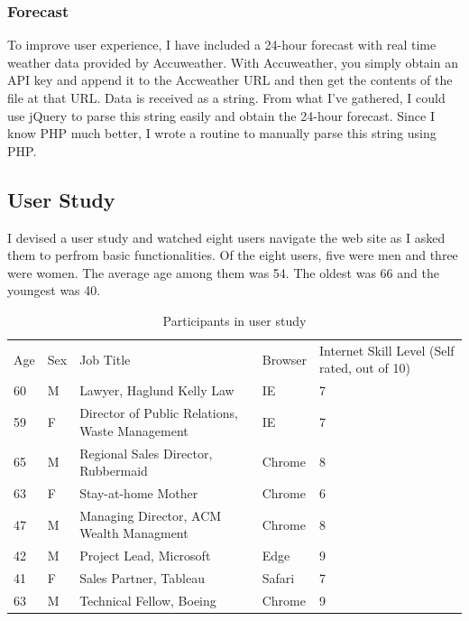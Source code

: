\documentclass[IEEEtran,letterpaper,10pt,titlepage,fleqn,draftclsnofoot,onecolumn]{article}
\begin{document}
\subsubsection{Forecast}

To improve user experience, I have included a 24-hour forecast with real time weather data provided by Accuweather. With Accuweather, you simply obtain an API key and append it to the Accweather URL and then get the contents of the file at that URL. Data is received as a string. From what I've gathered, I could use jQuery to parse this string easily and obtain the 24-hour forecast. Since I know PHP much better, I wrote a routine to manually parse this string using PHP.

\subsection{User Study}
I devised a user study and watched eight users navigate the web site as I asked them to perfrom basic functionalities. Of the eight users, five were men and three were women. The average age among them was 54. The oldest was 66 and the youngest was 40. 


\begin{table}[!htbp]
\centering

\label{User study participants}
\begin{tabular}{lllll}
Age & Sex & Job Title                                      & Browser & Internet Skill Level (Self rated, out of 10) \\
60  & M   & Lawyer, Haglund Kelly Law                      & IE      & 7                                            \\
59  & F   & Director of Public Relations, Waste Management & IE      & 7                                            \\
65  & M   & Regional Sales Director, Rubbermaid            & Chrome  & 8                                            \\
63  & F   & Stay-at-home Mother                            & Chrome  & 6                                            \\
47  & M   & Managing Director, ACM Wealth Managment        & Chrome  & 8                                            \\
42  & M   & Project Lead, Microsoft                        & Edge    & 9                                            \\
41  & F   & Sales Partner, Tableau                         & Safari  & 7                                            \\
63  & M   & Technical Fellow, Boeing                       & Chrome  & 9                                                   
\end{tabular}
\caption{Participants in user study}
\end{table}
\end{document}
